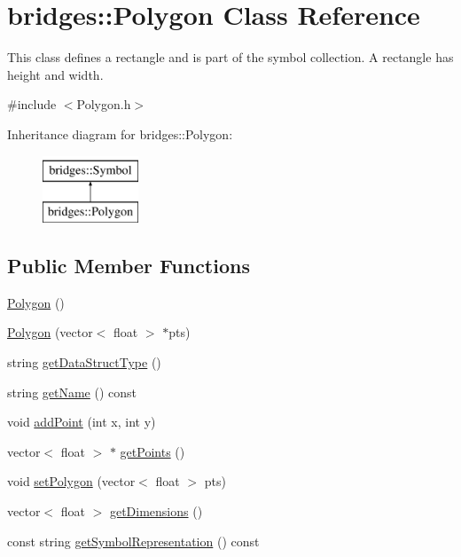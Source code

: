 \hypertarget{classbridges_1_1_polygon}{}\section{bridges\+:\+:Polygon Class Reference}
\label{classbridges_1_1_polygon}


This class defines a rectangle and is part of the symbol collection. A rectangle has height and width.  




{\ttfamily \#include $<$Polygon.\+h$>$}

Inheritance diagram for bridges\+:\+:Polygon\+:\begin{figure}[H]
\begin{center}
\leavevmode
\includegraphics[height=2.000000cm]{classbridges_1_1_polygon}
\end{center}
\end{figure}
\subsection*{Public Member Functions}
\begin{DoxyCompactItemize}
\item 
\hyperlink{classbridges_1_1_polygon_ade0fbaaa5a1b638ec6faec52ee6950f3}{Polygon} ()
\item 
\hyperlink{classbridges_1_1_polygon_acd99b72ad6c6d0ecc9cdc7a19b5bbcaf}{Polygon} (vector$<$ float $>$ $\ast$pts)
\item 
string \hyperlink{classbridges_1_1_polygon_a6b6d16de65c74f1e2e4e8f0ff4056451}{get\+Data\+Struct\+Type} ()
\item 
string \hyperlink{classbridges_1_1_polygon_aaac5207f4ecde96b3e6ba4c9aa4b25f7}{get\+Name} () const 
\item 
void \hyperlink{classbridges_1_1_polygon_ad38f9d5431e4a2dc9f5ed633e118c95c}{add\+Point} (int x, int y)
\item 
vector$<$ float $>$ $\ast$ \hyperlink{classbridges_1_1_polygon_aa4006759697d4428074747686cf231f9}{get\+Points} ()
\item 
void \hyperlink{classbridges_1_1_polygon_a43ffa2f8767318c9c831dad9ed030679}{set\+Polygon} (vector$<$ float $>$ pts)
\item 
vector$<$ float $>$ \hyperlink{classbridges_1_1_polygon_a6ad07473cb57633eca62a3f6832ea08c}{get\+Dimensions} ()
\item 
const string \hyperlink{classbridges_1_1_polygon_a64b629ff06da127142b49057776b4019}{get\+Symbol\+Representation} () const 
\end{DoxyCompactItemize}
